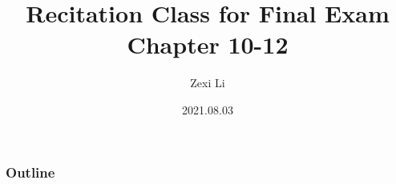 \documentclass{beamer}
\begin{document}
\renewcommand{\d}{\: \mathrm{d} }
\newcommand{\e}{\mathrm{e}}


\title[] {Recitation Class for Final Exam \\ Chapter 10-12}

\author[lzx]{Zexi Li}


\date{2021.08.03}

\frame{\titlepage}


\begin{frame}
    \frametitle{Outline}
    \tableofcontents
\end{frame}


\end{document}

